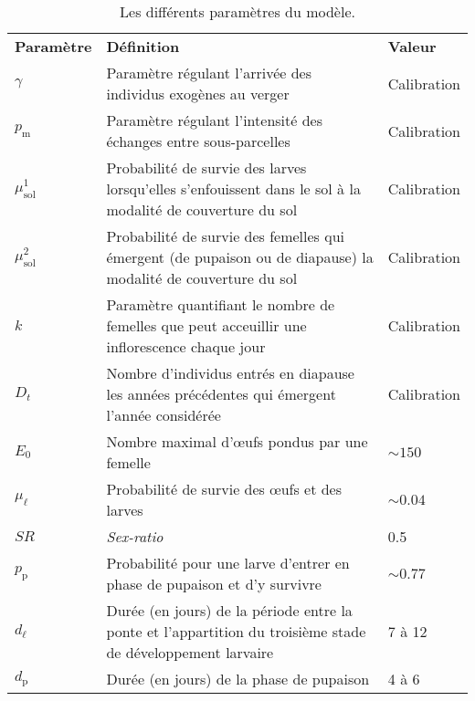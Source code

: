     \begin{landscape}%
\begin{table}
\caption{Les différents paramètres du modèle.}
\label{tab:param}
\centering
{
\begin{tabular}{p{2cm}p{11.9cm}p{5cm}}
\textbf{Paramètre} & \textbf{Définition} & \textbf{Valeur}\\
$\gamma$ & Paramètre régulant l'arrivée des individus exogènes au verger & Calibration\\
$p_{\text{m}}$ & Paramètre régulant l'intensité des échanges entre sous-parcelles & Calibration\\
$\mu_{\text{sol}}^1$ & Probabilité de survie des larves lorsqu'elles s'enfouissent dans le sol à la modalité de couverture du sol & Calibration\\
$\mu_{\text{sol}}^2$ & Probabilité de survie des femelles qui émergent (de pupaison ou de diapause) la modalité de couverture du sol & Calibration\\
$k$ & Paramètre quantifiant le nombre de femelles que peut acceuillir une inflorescence chaque jour & Calibration\\
$D_t$ & Nombre d'individus entrés en diapause les années précédentes qui émergent l'année considérée & Calibration  \\
$E_0$ & Nombre maximal d'œufs pondus par une femelle & $\sim\!150$ \citep{paul}\\
$\mu_{\ell}$ & Probabilité de survie des œufs et des larves & $\sim\!0.04$ \citep{paul}\\
$\mathit{SR}$ & \textit{Sex-ratio} & 0.5 \citep{paul}\\
$p_{\text{p}}$ & Probabilité pour une larve d'entrer en phase de pupaison et d'y survivre & $\sim\! 0.77$ \citep{pauldiap}\\
$d_{\ell}$ & Durée (en jours) de la période entre la ponte et l'appartition du troisième stade de développement larvaire & 7 à 12 \citep{paul} \\
$d_{\text{p}}$ & Durée (en jours) de la phase de pupaison & 4 à 6 \citep{paul}
\end{tabular}
}
\end{table}
    \end{landscape}

